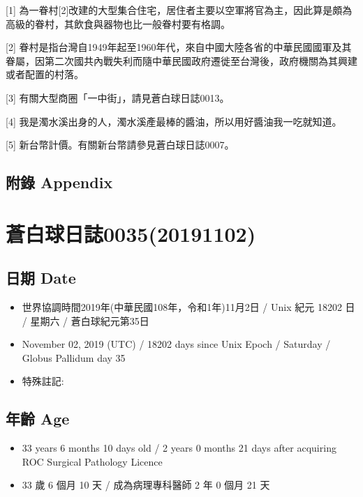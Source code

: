 \documentclass[a5paper, 12pt
]{book}
\providecommand{\tightlist}{%
  \setlength{\itemsep}{0pt}\setlength{\parskip}{0pt}}
\begin{document}
{[}1{]}
為一眷村{[}2{]}改建的大型集合住宅，居住者主要以空軍將官為主，因此算是頗為高級的眷村，其飲食與器物也比一般眷村要有格調。

{[}2{]}
眷村是指台灣自1949年起至1960年代，來自中國大陸各省的中華民國國軍及其眷屬，因第二次國共內戰失利而隨中華民國政府遷徙至台灣後，政府機關為其興建或者配置的村落。

{[}3{]} 有關大型商圈「一中街」，請見蒼白球日誌0013。

{[}4{]}
我是濁水溪出身的人，濁水溪產最棒的醬油，所以用好醬油我一吃就知道。

{[}5{]} 新台幣計價。有關新台幣請參見蒼白球日誌0007。

\hypertarget{ux9644ux9304-appendix-26}{%
\subsection{附錄 Appendix}\label{ux9644ux9304-appendix-26}}

\hypertarget{ux84bcux767dux7403ux65e5ux8a8c003520191102}{%
\section{蒼白球日誌0035(20191102)}\label{ux84bcux767dux7403ux65e5ux8a8c003520191102}}

\hypertarget{ux65e5ux671f-date-34}{%
\subsection{日期 Date}\label{ux65e5ux671f-date-34}}

\begin{itemize}
\tightlist
\item
  世界協調時間2019年(中華民國108年，令和1年)11月2日 / Unix 紀元 18202 日
  / 星期六 / 蒼白球紀元第35日
\item
  November 02, 2019 (UTC) / 18202 days since Unix Epoch / Saturday /
  Globus Pallidum day 35
\item
  特殊註記:
\end{itemize}

\hypertarget{ux5e74ux9f61-age-34}{%
\subsection{年齡 Age}\label{ux5e74ux9f61-age-34}}

\begin{itemize}
\tightlist
\item
  33 years 6 months 10 days old / 2 years 0 months 21 days after
  acquiring ROC Surgical Pathology Licence
\item
  33 歲 6 個月 10 天 / 成為病理專科醫師 2 年 0 個月 21 天
\end{itemize}
\end{document}
